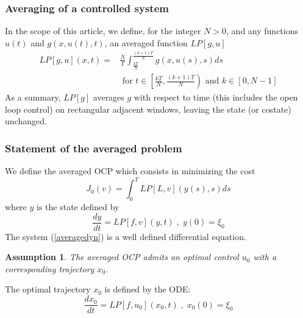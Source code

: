 \documentclass[a4paper,10pt]{article}
\newtheorem{assumption}{Assumption}
\begin{document}
\subsubsection{Averaging of a controlled system}

In the scope of this article, we define, for the integer $N>0$, and 
any functions $u(t)$ and $g(x,u(t),t)$, an averaged function $LP[g,u]$
\begin{equation}\label{average}
	\begin{split}
    LP[g,u](x,t)= &
    \frac{N}{T}\int_{\frac{kT}{N}}^{\frac{(k+1)T}{N}}g(x,u(s),s)ds\\ 
    & \textrm{ for } t\in\left[
    \frac{kT}{N},\frac{(k+1)T}{N}\right) \textrm{ and } k\in[0,N-1]
	\end{split}
\end{equation}
As a summary, $LP[g]$ averages $g$ with respect to time (this 
includes the open loop control) on rectangular adjacent windows, 
leaving the state (or costate) unchanged.

\subsubsection{Statement of the averaged problem}\label{aveProblem}
We define the averaged OCP which consists in minimizing the cost
\begin{equation}
    J_{0}(v)=\int_{0}^{T}LP[L,v](y(s),s)ds
    \label{averagecost}
\end{equation}
where $y$ is the state defined by
\begin{equation}
    \frac{dy}{dt}=LP[f,v](y,t)\; , \; y(0)=\xi_{0}
    \label{averagedyn}
\end{equation}
The system (\ref{averagedyn}) is a well defined differential equation.
\begin{assumption}\label{aveOCPsolution}
    The averaged OCP
    admits an optimal control $u_{0}$ with a corresponding trajectory 
    $x_{0}$.
\end{assumption}
The optimal trajectory $x_{0}$ is defined by the ODE:
\begin{equation}
    \frac{dx_{0}}{dt}=LP[f,u_{0}](x_{0},t)\; , \; x_{0}(0)=\xi_{0}
    \label{aveOptTraj}
\end{equation}
\end{document}
